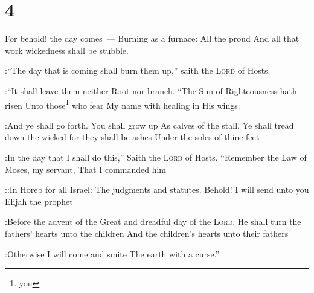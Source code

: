 \section{4}
\begin{enumerate}[align=center]
     For behold! the day comes~--- Burning as a furnace: All the proud And all that work wickedness shall be stubble.

:``The day that is coming shall burn them up,'' saith the \textsc{Lord} of Hosts.

:``It shall leave them neither Root nor branch.%
     ``The Sun of Righteousness hath risen Unto those\footnote{you} who fear My name with healing in His wings.

:And ye shall go forth. You shall grow up As calves of the stall.%
     Ye shall tread down the wicked for they shall be ashes Under the soles of thine feet

:In the day that I shall do this,'' Saith the \textsc{Lord} of Hosts.%
     ``Remember the Law of Moses, my servant, That I commanded him

::In Horeb for all Israel: The judgments and statutes.%
     Behold! I will send unto you Elijah the prophet

:Before the advent of the Great and dreadful day of the \textsc{Lord}.%
     He shall turn the fathers' hearts unto the children And the children's hearts unto their fathers

:Otherwise I will come and smite The earth with a curse.''%
\end{enumerate}
